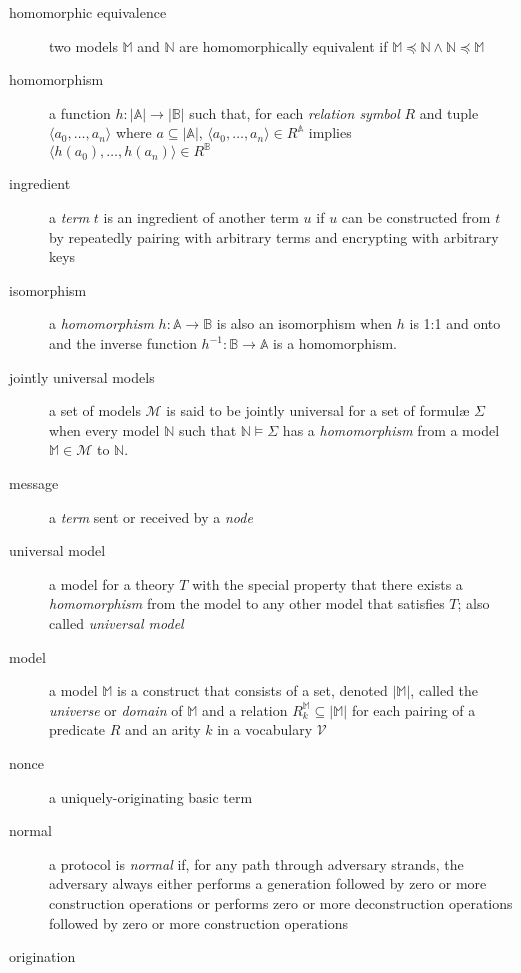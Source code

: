 \begin{description}
		\item[homomorphic equivalence]
			two models $\mathbb{M}$ and $\mathbb{N}$ are homomorphically
			equivalent if $\mathbb{M} \preceq \mathbb{N} \wedge \mathbb{N}
			\preceq \mathbb{M}$
		\item[homomorphism]
			a function $h: |\mathbb{A}|\to|\mathbb{B}|$ such that, for each
			\emph{relation symbol} $R$ and tuple $\langle a_0 , \ldots , a_n
			\rangle$ where $a \subseteq |\mathbb{A}|$, $\langle a_0 , \ldots ,
			a_n \rangle \in R^\mathbb{A}$ implies $\langle h(a_0) , \ldots ,
			h(a_n) \rangle \in R^\mathbb{B}$
		\item[ingredient]
			a \emph{term} $t$ is an ingredient of another term $u$ if $u$ can
			be constructed from $t$ by repeatedly pairing with arbitrary terms
			and encrypting with arbitrary keys
		\item[isomorphism]
			a \emph{homomorphism} $h : \mathbb{A} \to \mathbb{B}$ is also an
			isomorphism when $h$ is 1:1 and onto and the inverse
			function $h^{-1} : \mathbb{B} \to \mathbb{A}$ is a homomorphism.
		\item[jointly universal models]
			a set of models $\mathcal{M}$ is said to be jointly universal
			for a set of formul{\ae} $\Sigma$ when every model $\mathbb{N}$
			such that $\mathbb{N} \models \Sigma$ has a \emph{homomorphism} from a
			model $\mathbb{M} \in \mathcal{M}$ to $\mathbb{N}$.
		\item[message]
			a \emph{term} sent or received by a \emph{node}
		\item[universal model]
			a model for a theory $T$ with the special property that there exists
			a \emph{homomorphism} from the model to any other model that
			satisfies $T$; also called \emph{universal model}
		\item[model]
			a model $\mathbb{M}$ is a construct that consists of a set, denoted
			$|\mathbb{M}|$, called the \emph{universe} or \emph{domain} of
			$\mathbb{M}$ and a relation $R^\mathbb{M}_k \subseteq |\mathbb{M}|$
			for each pairing of a predicate $R$ and an arity $k$ in a vocabulary
			$\mathcal{V}$
		\item[nonce]
			a uniquely-originating basic term
		\item[normal]
			a protocol is \emph{normal} if, for any path through adversary
			strands, the adversary always either performs a generation followed
			by zero or more construction operations or performs zero or more
			deconstruction operations followed by zero or more construction
			operations
		\item[origination]

\end{description}
